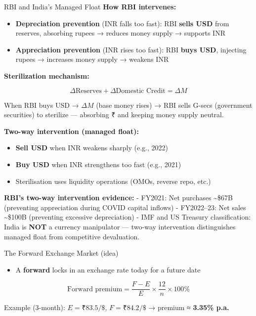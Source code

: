 \documentclass[
  ignorenonframetext,
  aspectratio=169,
]{beamer}
\makeatletter
\providecommand{\tightlist}{%
  \setlength{\itemsep}{0pt}\setlength{\parskip}{0pt}}
\let\quarto@originallabel\label
\DeclareRobustCommand*{\label}[1]{\quarto@originallabel{#1}}
\makeatother
\begin{document}
\begin{frame}{RBI and India's Managed Float}
\label{rbi-and-indias-managed-float}
\textbf{How RBI intervenes:}

\begin{itemize}
\tightlist
\item
  \textbf{Depreciation prevention} (INR falls too fast): RBI
  \textbf{sells USD} from reserves, absorbing rupees → reduces money
  supply → supports INR
\item
  \textbf{Appreciation prevention} (INR rises too fast): RBI
  \textbf{buys USD}, injecting rupees → increases money supply → weakens
  INR
\end{itemize}

\textbf{Sterilization mechanism:}

\[\Delta \text{Reserves} + \Delta \text{Domestic Credit} = \Delta M\]

When RBI buys USD → \(\Delta M\) (base money rises) → RBI sells G-secs
(government securities) to sterilize --- absorbing ₹ and keeping money
supply neutral.

\textbf{Two-way intervention (managed float):}

\begin{itemize}
\tightlist
\item
  \textbf{Sell USD} when INR weakens sharply (e.g., 2022)
\item
  \textbf{Buy USD} when INR strengthens too fast (e.g., 2021)
\item
  Sterilisation uses liquidity operations (OMOs, reverse repo, etc.)
\end{itemize}

\textbf{RBI's two-way intervention evidence:} - FY2021: Net purchases
\textasciitilde\$67B (preventing appreciation during COVID capital
inflows) - FY2022--23: Net sales \textasciitilde\$100B (preventing
excessive depreciation) - IMF and US Treasury classification: India is
\textbf{NOT} a currency manipulator --- two-way intervention
distinguishes managed float from competitive devaluation.
\end{frame}

\begin{frame}{The Forward Exchange Market (idea)}
\label{the-forward-exchange-market-idea}
\begin{itemize}
\tightlist
\item
  A \textbf{forward} locks in an exchange rate today for a future date
\end{itemize}

\[\text{Forward premium} = \frac{F - E}{E} \times \frac{12}{n} \times 100\%\]

Example (3-month): \(E=₹83.5/\$\), \(F=₹84.2/\$\) → premium ≈
\textbf{3.35\% p.a.}
\end{frame}
\end{document}
